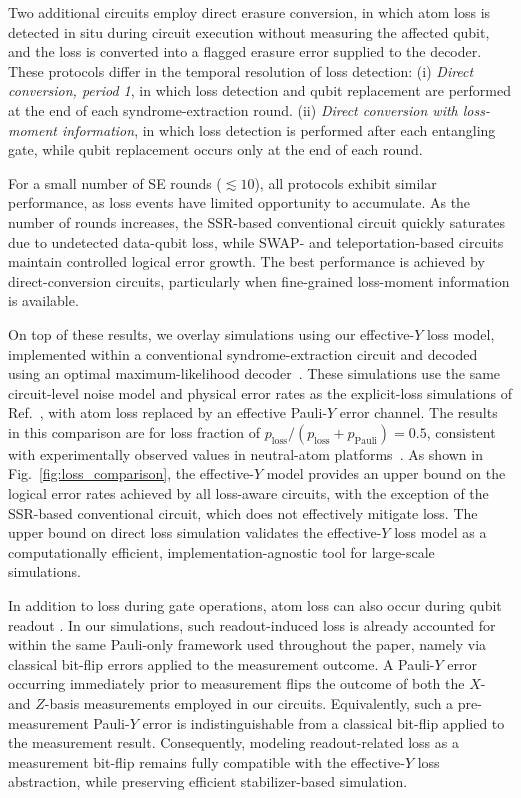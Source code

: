 \documentclass[aps, prx, reprint, superscriptaddress, longbibliography, floatfix]{revtex4-2}
\begin{document}
Two additional circuits employ direct erasure conversion, in which atom loss is detected in situ during circuit execution without measuring the affected qubit, and the loss is converted into a flagged erasure error supplied to the decoder. These protocols differ in the temporal resolution of loss detection:
(i) \emph{Direct conversion, period 1}, in which loss detection and qubit replacement are performed at the end of each syndrome-extraction round.
(ii) \emph{Direct conversion with loss-moment information}, in which loss detection is performed after each entangling gate, while qubit replacement occurs only at the end of each round.

For a small number of SE rounds ($\lesssim 10$), all protocols exhibit similar performance, as loss events have limited opportunity to accumulate. As the number of rounds increases, the SSR-based conventional circuit quickly saturates due to undetected data-qubit loss, while SWAP- and teleportation-based circuits maintain controlled logical error growth. The best performance is achieved by direct-conversion circuits, particularly when fine-grained loss-moment information is available.

On top of these results, we overlay simulations using our effective-$Y$ loss model, implemented within a conventional syndrome-extraction circuit and decoded using an optimal maximum-likelihood decoder~\cite{gurobi}. These simulations use the same circuit-level noise model and physical error rates as the explicit-loss simulations of Ref.~\cite{baranes2025}, with atom loss replaced by an effective Pauli-$Y$ error channel. The results in this comparison are for loss fraction of $ p_{\mathrm{loss}}/(p_{\mathrm{loss}} + p_{\mathrm{Pauli}})= 0.5$,
consistent with experimentally observed values in neutral-atom platforms~\cite{Bluvstein2024, Evered2023}. As shown in Fig.~\ref{fig:loss_comparison}, the effective-$Y$ model provides an upper bound on the logical error rates achieved by all loss-aware circuits, with the exception of the SSR-based conventional circuit, which does not effectively mitigate loss. The upper bound on direct loss simulation validates the effective-$Y$ loss model as a computationally efficient, implementation-agnostic tool for large-scale simulations.

In addition to loss during gate operations, atom loss can also occur during qubit readout \cite{Gibbons_readout_loss_2011}. In our simulations, such readout-induced loss is already accounted for within the same Pauli-only framework used throughout the paper, namely via classical bit-flip errors applied to the measurement outcome. A Pauli-$Y$ error occurring immediately prior to measurement flips the outcome of both the $X$- and $Z$-basis measurements employed in our circuits. Equivalently, such a pre-measurement Pauli-$Y$ error is indistinguishable from a classical bit-flip applied to the measurement result. Consequently, modeling readout-related loss as a measurement bit-flip remains fully compatible with the effective-$Y$ loss abstraction, while preserving efficient stabilizer-based simulation.
\end{document}
